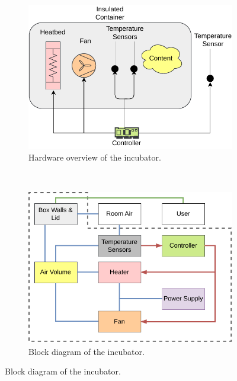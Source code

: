\begin{figure}[ht]
	\centering
	\begin{subfigure}[t]{0.48\textwidth}
		\centering
		\includegraphics[width=\textwidth]{images/system_hardware.pdf}
		\caption{Hardware overview of the incubator.}
		\label{subfig:incubator_hw}
	\end{subfigure}%
	~
	\begin{subfigure}[t]{0.48\textwidth}
		\centering
		\includegraphics[width=\textwidth]{images/system_block.pdf}
		\caption{Block diagram of the incubator.}
		\label{subfig:incubator_blocks}
	\end{subfigure}%


\end{figure}
